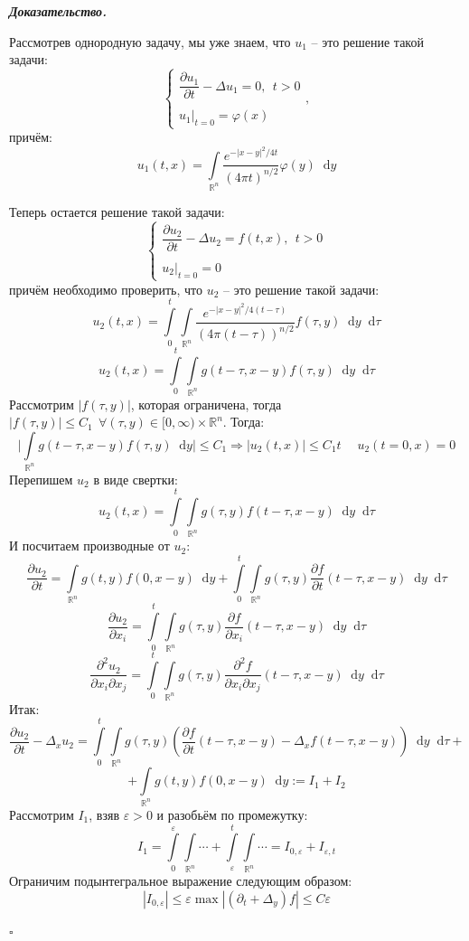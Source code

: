 \documentclass[11pt,a4paper]{report}
\numberwithin{equation}{section}
\numberwithin{figure}{chapter}
\numberwithin{table}{chapter}
\newenvironment{myproof}{%
    \begin{tcolorbox}[mathphysblock,colframe=proofcolor!65,colback=proofcolor!2,boxrule=0.5pt]
    \textit{\textbf{Доказательство.}}\par\smallskip
}{%
    \hfill$\square$
    \end{tcolorbox}
}
\newcommand{\R}{\mathbb{R}}
\newcommand{\p}{\partial}
\newcommand{\dd}{\mathop{}\!\mathrm{d}}
\renewcommand{\phi}{\varphi}
\renewcommand{\epsilon}{\varepsilon}
\begin{document}
\begin{myproof}
    Рассмотрев однородную задачу, мы уже знаем, что $u_1$ -- это решение такой задачи:
    \[\begin{cases}
        \dfrac{\p u_1}{\p t} - \Delta u_1 = 0, \ \ t>0\\\\
        u_1\Big|_{t=0} = \phi(x)
    \end{cases}, \] причём:
    \[u_1(t,x) = \int\limits_{\R^n}\dfrac{e^{-|x-y|^2/4t}}{(4\pi t)^{n/2}}\phi(y)\dd y\]
    
    Теперь остается решение такой задачи:
    \[\begin{cases}
        \dfrac{\p u_2}{\p t} - \Delta u_2 = f(t,x), \ \ t>0\\\\
        u_2\Big|_{t=0} = 0
    \end{cases}\]
    причём необходимо проверить, что $u_2$ -- это решение такой задачи:
    \[u_2(t,x) = \int\limits_{0}^{t}\int\limits_{\R^n}\dfrac{e^{-|x-y|^2/4(t-\tau)}}{(4\pi(t-\tau))^{n/2}}f(\tau, y)\dd y\dd \tau\]
    \[u_2(t,x) = \int\limits_{0}^{t}\int\limits_{\R^n}g(t-\tau,x-y)f(\tau, y)\dd y\dd \tau\]
    Рассмотрим $|f(\tau, y)|$, которая ограничена, тогда $|f(\tau, y)|\leq C_1 \ \ \forall (\tau,y)\in[0,\infty)\times\R^n$. Тогда:
\[\Bigg|\int\limits_{\R^n}g(t-\tau,x-y)f(\tau, y)\dd y\Bigg|\leq C_1 \Rightarrow |u_2(t,x)|\leq C_1t\; \quad u_2(t=0,x)=0\]
Перепишем $u_2$ в виде свертки:
\[u_2(t,x) = \int\limits_{0}^{t}\int\limits_{\R^n}g(\tau,y)f(t-\tau, x-y)\dd y\dd \tau\]
И посчитаем производные от $u_2$:
\[\dfrac{\p u_2}{\p t} = \int\limits_{\R^n}g(t,y)f(0, x-y)\dd y + \int\limits_{0}^{t}\int\limits_{\R^n}g(\tau,y)\dfrac{\p f}{\p t}(t-\tau,x-y)\dd y\dd \tau\]
\[\dfrac{\p u_2}{\p x_i} = \int\limits_{0}^{t}\int\limits_{\R^n}g(\tau,y)\dfrac{\p f}{\p x_i}(t-\tau, x-y)\dd y\dd \tau\]
\[\dfrac{\p^2 u_2}{\p x_i \p x_j} = \int\limits_{0}^{t}\int\limits_{\R^n}g(\tau,y)\dfrac{\p^2 f}{\p x_i \p x_j}(t-\tau, x-y)\dd y\dd \tau\]
Итак:
\[\dfrac{\p u_2}{\p t} - \Delta_x u_2 = \int\limits_{0}^{t}\int\limits_{\R^n}g(\tau,y)\left(\dfrac{\p f}{\p t}(t-\tau, x-y) - \Delta_x f(t-\tau, x-y)\right)\dd y\dd \tau+\]\[+\int\limits_{\R^n}g(t,y)f(0, x-y)\dd y :=I_1+I_2\]
    Рассмотрим $I_1$, взяв $\epsilon>0$ и разобьём по промежутку:
    \[
    I_1 = \int\limits_0^\epsilon\int\limits_{\R^n}\cdots+\int\limits_\epsilon^{t}\int\limits_{\R^n}\cdots = I_{0,\epsilon} + I_{\epsilon,t}
    \]
 Ограничим подынтегральное выражение следующим образом:
    \[
    |I_{0,\epsilon}|\leq \varepsilon \operatorname{max}|(\p_t+\Delta_y)f|\leq C\varepsilon\]

\end{myproof}
\end{document}
